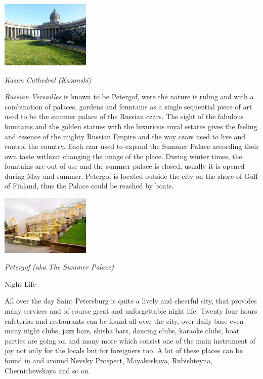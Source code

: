 \documentclass[10pt,a4paper]{article} %
\newcommand{\NewsItem}[1]{ %
\usefont{T1}{fvs}{n}{n} %
\vspace{24pt}\large #1\vspace{3pt} %
\par \normalsize \normalfont}
\begin{document}
\begin{multicols}{3}
\begin{center}
	\includegraphics[width=0.32\textwidth]{media/kazan.jpg}
	\par\textit{Kazan Cathedral (Kazanski)}
\end{center}

\textit{Russian Versailles} is known to be Petergof, 
were the nature is ruling and with a combination of palaces, 
gardens and fountains as a single sequential piece of art used to be the summer palace 
of the Russian czars. 
The sight of the fabulous fountains and the golden statues with the luxurious 
royal estates gives the feeling and essence of the mighty Russian Empire and 
the way czars used to live and control the country. 
Each czar used to expand the Summer Palace according their own taste without 
changing the image of the place. During winter times, 
the fountains are out of use and the summer palace is closed, 
usually it is opened during May and summer. 
Petergof is located outside the city on the shore of Gulf of Finland, 
thus the Palace could be reached by boats.

\begin{center}
	\includegraphics[width=0.32\textwidth]{media/peterhof.jpg}
	\par\textit{Petergof (aka The Summer Palace)}
\end{center}

\NewsItem{Night Life}

All over the day Saint Petersburg is quite a lively and cheerful city, 
that provides many services and of course great and unforgettable night life. 
Twenty four hours cafeterias and restaurants can be found all over the city, 
over daily base even many night clubs, jazz bars, shisha bars, dancing clubs, 
karaoke clubs, boat parties are going on and many more which consist one 
of the main instrument of joy not only for the locals but for foreigners too. 
A lot of these places can be found in and around Nevsky Prospect, Mayakoskaya, 
Rubishteyna, Chernichevskaya and so on. 


\end{multicols}
\end{document}
